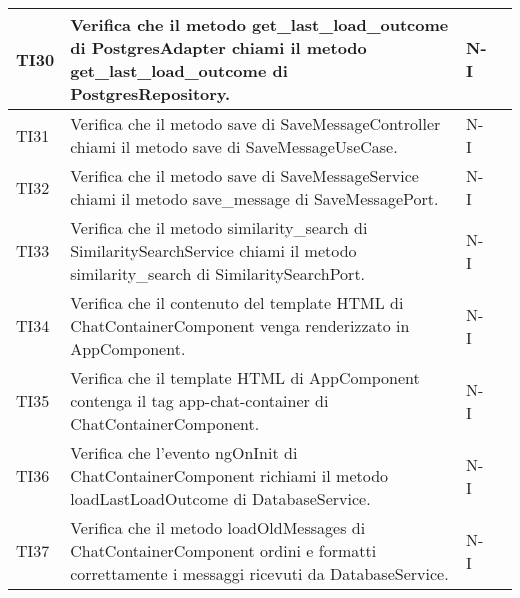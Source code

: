 \begin{table}[h!]
\begin{tabularx}{\textwidth}{|p{}|X|p{}|p{}|}
    TI30 & Verifica che il metodo get\_last\_load\_outcome di PostgresAdapter chiami il metodo get\_last\_load\_outcome di PostgresRepository. &  N-I \\ \hline
    TI31 & Verifica che il metodo save di SaveMessageController chiami il metodo save di SaveMessageUseCase. &  N-I \\ \hline
    TI32 & Verifica che il metodo save di SaveMessageService chiami il metodo save\_message di SaveMessagePort. &  N-I \\ \hline
    TI33 & Verifica che il metodo similarity\_search di SimilaritySearchService chiami il metodo similarity\_search di SimilaritySearchPort. &  N-I \\ \hline
    TI34 & Verifica che il contenuto del template HTML di ChatContainerComponent venga renderizzato in AppComponent. &  N-I \\ \hline
    TI35 & Verifica che il template HTML di AppComponent contenga il tag app-chat-container di ChatContainerComponent. &  N-I \\ \hline
    TI36 & Verifica che l'evento ngOnInit di ChatContainerComponent richiami il metodo loadLastLoadOutcome di DatabaseService. &  N-I \\ \hline
    TI37 & Verifica che il metodo loadOldMessages di ChatContainerComponent ordini e formatti correttamente i messaggi ricevuti da DatabaseService. &  N-I \\ \hline
    \end{tabularx}
\end{table}

\newpage

